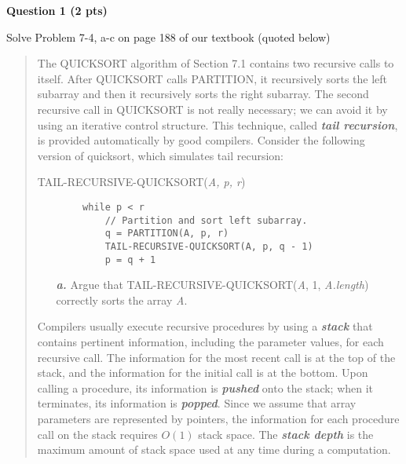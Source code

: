 \documentclass{article}
\begin{document}
\begin{framed}
    \textbf{Question 1 (2 pts)} 
    
    Solve Problem 7-4, a-c on page 188 of our textbook (quoted below)
    
    \begin{quote}
        The \uppercase{Quicksort} algorithm of Section 7.1 contains two
        recursive calls to itself. After \uppercase{Quicksort} calls
        \uppercase{Partition}, it recursively sorts the left subarray and then
        it recursively sorts the right subarray. The second recursive call in
        \uppercase{Quicksort} is not really necessary; we can avoid it by using
        an iterative control structure. This technique, called
        \textbf{\textit{tail recursion}}, is provided automatically by good
        compilers. Consider the following version of quicksort, which simulates
        tail recursion:
        
        TAIL-RECURSIVE-QUICKSORT(\textit{A, p, r})
        \begin{verbatim}
        while p < r
            // Partition and sort left subarray.
            q = PARTITION(A, p, r)
            TAIL-RECURSIVE-QUICKSORT(A, p, q - 1)
            p = q + 1
        \end{verbatim}
        \begin{enumerate}
            \item[\textbf{\textit{a.}}] Argue that 
            TAIL-RECURSIVE-QUICKSORT(\textit{A}, 1, \textit{A.length}) correctly
            sorts the array \textit{A}.
        \end{enumerate}
        
        Compilers usually execute recursive procedures by using a
        \textbf{\textit{stack}} that contains pertinent information, including
        the parameter values, for each recursive call. The information for the
        most recent call is at the top of the stack, and the information for the
        initial call is at the bottom. Upon calling a procedure, its information
        is \textbf{\textit{pushed}} onto the stack; when it terminates, its
        information is \textbf{\textit{popped}}. Since we assume that array
        parameters are represented by pointers, the information for each
        procedure call on the stack requires $O(1)$ stack space. The
        \textbf{\textit{stack depth}} is the maximum amount of stack space used
        at any time during a computation. 
        

\end{quote}
\end{framed}
\end{document}
